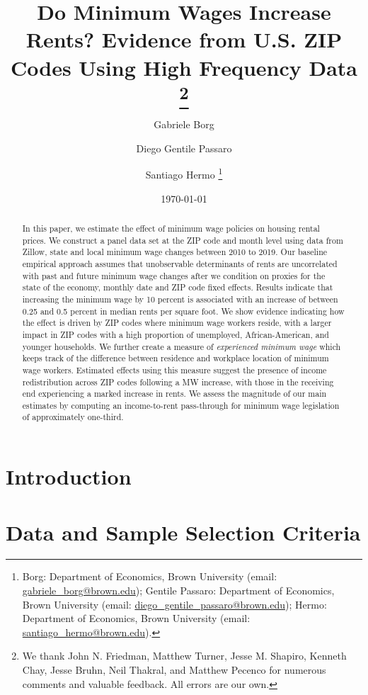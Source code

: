 \documentclass{article}
\title{Do Minimum Wages Increase Rents? 
	   Evidence from U.S. ZIP Codes Using High Frequency Data 
	   \thanks{We thank John N. Friedman, Matthew Turner, Jesse M. Shapiro, 
	   	Kenneth Chay, Jesse Bruhn, Neil Thakral, and Matthew Pecenco for numerous 
	   	comments and valuable feedback. All errors are our own.}}
\author{Gabriele Borg \and Diego Gentile Passaro \and Santiago Hermo
		\footnote{
		Borg: Department of Economics, Brown University 
		(email: \url{gabriele_borg@brown.edu}); 
		Gentile Passaro: Department of Economics, Brown University 
		(email: \url{diego_gentile_passaro@brown.edu}); 
		Hermo: Department of Economics, Brown University 
		(email: \url{santiago_hermo@brown.edu}).}
		}
\date{\today}
\begin{document}
\maketitle

\begin{abstract}
    \noindent
    In this paper, we estimate the effect of minimum wage policies on housing rental 
    prices. We construct a panel data set at the ZIP code and month level using data 
    from Zillow, state and local minimum wage changes between 2010 to 2019. 
    Our baseline empirical approach assumes that unobservable determinants of rents 
    are uncorrelated with past and future minimum wage changes after we condition on 
    proxies for the state of the economy, monthly date and ZIP code fixed effects. 
    Results indicate that increasing the minimum wage by 10 percent is associated with 
    an increase of between 0.25 and 0.5 percent in median rents per square foot. 
    We show evidence indicating how the effect is driven by ZIP codes where minimum 
    wage workers reside, with a larger impact in ZIP codes with a high proportion of 
    unemployed, African-American, and younger households. 
    We further create a measure of \textit{experienced minimum wage} which keeps track 
    of the difference between residence and workplace location of minimum wage workers. 
    Estimated effects using this measure suggest the presence of income redistribution 
    across ZIP codes following a MW increase, with those in the receiving end 
    experiencing a marked increase in rents. 
    We assess the magnitude of our main estimates by computing an income-to-rent 
    pass-through for minimum wage legislation of approximately one-third. 
\end{abstract}

\vspace{5mm}

\maketitle


\clearpage

\section{Introduction}\label{sec:intro}
    

\section{Data and Sample Selection Criteria}\label{sec:data}
	
\end{document}
